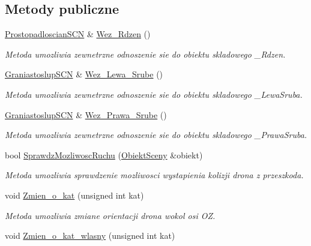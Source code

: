 \subsection*{Metody publiczne}
\begin{DoxyCompactItemize}
\item 
\hyperlink{classProstopadloscianSCN}{Prostopadloscian\+S\+CN} \& \hyperlink{classDron_addd3f76aedda33de1c13d7a0cd5bea69}{Wez\+\_\+\+Rdzen} ()
\begin{DoxyCompactList}\small\item\em Metoda umozliwia zewnetrzne odnoszenie sie do obiektu skladowego \+\_\+\+Rdzen. \end{DoxyCompactList}\item 
\hyperlink{classGraniastoslupSCN}{Graniastoslup\+S\+CN} \& \hyperlink{classDron_a18b1d0162c88a8e93322d6eb5d7b64f0}{Wez\+\_\+\+Lewa\+\_\+\+Srube} ()
\begin{DoxyCompactList}\small\item\em Metoda umozliwia zewnetrzne odnoszenie sie do obiektu skladowego \+\_\+\+Lewa\+Sruba. \end{DoxyCompactList}\item 
\hyperlink{classGraniastoslupSCN}{Graniastoslup\+S\+CN} \& \hyperlink{classDron_a1bdfbac069ae0f0ef1b168f0f2d9bc6e}{Wez\+\_\+\+Prawa\+\_\+\+Srube} ()
\begin{DoxyCompactList}\small\item\em Metoda umozliwia zewnetrzne odnoszenie sie do obiektu skladowego \+\_\+\+Prawa\+Sruba. \end{DoxyCompactList}\item 
bool \hyperlink{classDron_a5ddaabc5c441d8f2f204cc398e1b0db2}{Sprawdz\+Mozliwosc\+Ruchu} (\hyperlink{classObiektSceny}{Obiekt\+Sceny} \&obiekt)
\begin{DoxyCompactList}\small\item\em Metoda umozliwia sprawdzenie mozliwosci wystapienia kolizji drona z przeszkoda. \end{DoxyCompactList}\item 
void \hyperlink{classDron_a75782b1ce9cd9f911e45f87f75ae95d6}{Zmien\+\_\+o\+\_\+kat} (unsigned int kat)
\begin{DoxyCompactList}\small\item\em Metoda umozliwia zmiane orientacji drona wokol osi OZ. \end{DoxyCompactList}\item 
void \hyperlink{classDron_a6fcd15ec24881f0e92e84fc04ddd9a9a}{Zmien\+\_\+o\+\_\+kat\+\_\+wlasny} (unsigned int kat)

\end{DoxyCompactItemize}
